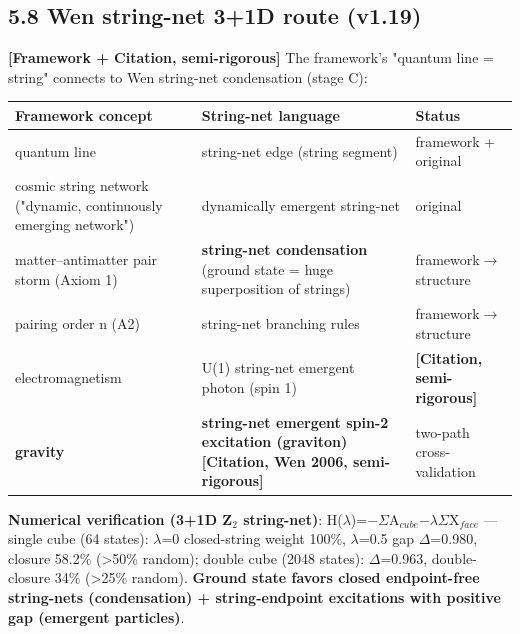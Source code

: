 \documentclass[12pt]{article}
\newcommand{\mtag}[1]{\textbf{[#1]}}
\newcommand{\down}[1]{\ensuremath{_{#1}}}
\begin{document}
\subsection{5.8 Wen string-net 3+1D route (v1.19)}

\mtag{Framework + Citation, semi-rigorous} The framework's "quantum line = string" connects to Wen string-net condensation (stage C):

\begin{table}[htbp]
\centering
\small
\begin{tabularx}{\textwidth}{@{}lXX@{}}
\toprule
Framework concept & String-net language & Status \\
\midrule
quantum line & string-net edge (string segment) & framework + original \\
cosmic string network ("dynamic, continuously emerging network") & dynamically emergent string-net & original \\
matter--antimatter pair storm (Axiom 1) & \textbf{string-net condensation} (ground state = huge superposition of strings) & framework\ensuremath{\to}structure \\
pairing order n (A2) & string-net branching rules & framework\ensuremath{\to}structure \\
electromagnetism & U(1) string-net emergent photon (spin 1) & \mtag{Citation, semi-rigorous} \\
\textbf{gravity} & \textbf{string-net emergent spin-2 excitation (graviton)}\mtag{Citation, Wen 2006, semi-rigorous} & two-path cross-validation \\
\bottomrule
\end{tabularx}
\end{table}

\textbf{Numerical verification (3+1D Z\down{2} string-net)}: H(\ensuremath{\lambda})=\ensuremath{-}\ensuremath{\Sigma}A\down{cube}\ensuremath{-}\ensuremath{\lambda}\ensuremath{\Sigma}X\down{face} --- single cube (64 states): \ensuremath{\lambda}=0 closed-string weight 100\%, \ensuremath{\lambda}=0.5 gap \ensuremath{\Delta}=0.980, closure 58.2\% (>50\% random); double cube (2048 states): \ensuremath{\Delta}=0.963, double-closure 34\% (>25\% random). \textbf{Ground state favors closed endpoint-free string-nets (condensation) + string-endpoint excitations with positive gap (emergent particles)}.
\end{document}
